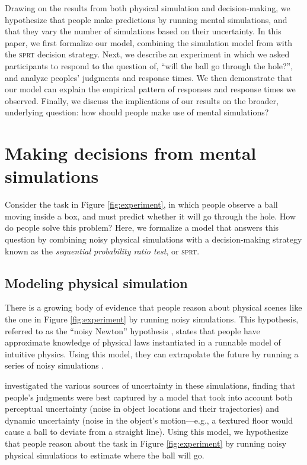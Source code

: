 \documentclass[10pt,letterpaper]{article}
\begin{document}
Drawing on the results from both physical simulation and decision-making, we hypothesize that people make predictions by running mental simulations, and that they vary the number of simulations based on their uncertainty.
In this paper, we first formalize our model, combining the simulation model from  with the \textsc{sprt} decision strategy. 
Next, we describe an experiment in which we asked participants to respond to the question of, ``will the ball go through the hole?'', and analyze peoples' judgments and response times. 
We then demonstrate that our model can explain the empirical pattern of responses and response times we observed. 
Finally, we discuss the implications of our results on the broader, underlying question: how should people make use of mental simulations?

\section{Making decisions from mental simulations}

Consider the task in Figure \ref{fig:experiment}, in which people observe a ball moving inside a box, and must predict whether it will go through the hole.
How do people solve this problem?
Here, we formalize a model that answers this question by combining noisy physical simulations with a decision-making strategy known as the \emph{sequential probability ratio test}, or \textsc{sprt}.

\subsection{Modeling physical simulation}

There is a growing body of evidence that people reason about physical scenes like the one in Figure \ref{fig:experiment} by running noisy simulations.
This hypothesis, referred to as the ``noisy Newton'' hypothesis \cite{Sanborn2013}, states that people have approximate knowledge of physical laws instantiated in a runnable model of intuitive physics.
Using this model, they can extrapolate the future by running a series of noisy simulations \cite{Smith:2013fc,Battaglia2013,Smith:2013ug,Smith:2013th,Smith:2014tx,Ullman:2014ut,Hamrick:2015}.

 investigated the various sources of uncertainty in these simulations, finding that people's judgments were best captured by a model that took into account both perceptual uncertainty (noise in object locations and their trajectories) and dynamic uncertainty (noise in the object's motion---e.g., a textured floor would cause a ball to deviate from a straight line).
Using this model, we hypothesize that people reason about the task in Figure \ref{fig:experiment} by running noisy physical simulations to estimate where the ball will go.
\end{document}
